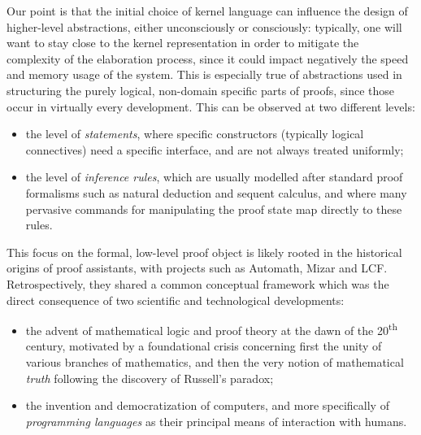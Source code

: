 Our point is that the initial choice of kernel language can influence the design
of higher-level abstractions, either unconsciously or consciously: typically,
one will want to stay close to the kernel representation in order to mitigate
the complexity of the elaboration process, since it could impact negatively the
speed and memory usage of the system. This is especially true of abstractions
used in structuring the purely logical, non-domain specific parts of proofs,
since those occur in virtually every development. This can be observed at two
different levels:
\begin{itemize}
  \item the level of \emph{statements}, where specific constructors (typically
  logical connectives) need a specific interface, and are not always treated
  uniformly;
  \item the level of \emph{inference rules}, which are usually modelled after
  standard proof formalisms such as natural deduction and sequent
  calculus, and where many pervasive commands for
  manipulating the proof state map directly to these rules. 
\end{itemize}

This focus on the formal, low-level proof object is likely rooted in the
historical origins of proof assistants, with projects such as Automath, Mizar
and LCF. Retrospectively, they shared a common conceptual
framework which was the direct consequence of two scientific and technological
developments:
\begin{itemize}
  \item the advent of mathematical logic and proof theory at the dawn of the
  20\textsuperscript{th} century, motivated by a foundational crisis concerning
  first the unity of various branches of mathematics, and then the very notion
  of mathematical \emph{truth} following the discovery of Russell's paradox;
  \item the invention and democratization of computers, and more specifically of
  \emph{programming languages} as their principal means of interaction with
  humans.
\end{itemize}

